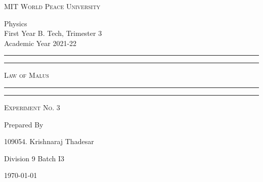 \documentclass[11pt]{article}
\begin{document}
	
	\begin{titlepage} 
		\centering 
		
		
		\huge\textsc{
			MIT World Peace University
		}\\
	
		\vspace{0.75\baselineskip} %
		
		\LARGE{
			Physics\\
			First Year B. Tech, Trimester 3\\
			Academic Year 2021-22
		}
		
		\vfill %
		
		
		\rule{\textwidth}{1.6pt}\vspace*{-\baselineskip}\vspace*{2pt}
		\rule{\textwidth}{0.6pt}
		\vspace{0.75\baselineskip} %
		
		
		
		\huge{\textsc{
				Law of Malus
			}} \\
		
		
		
		\vspace{0.5\baselineskip} %
		\rule{\textwidth}{0.6pt}\vspace*{-\baselineskip}\vspace*{2.8pt}
		\rule{\textwidth}{1.6pt}
		
		\vspace{1\baselineskip} %

			
		\LARGE\textsc{
			Experiment No. 3
		} %
		\vfill
		
		
		Prepared By
		\vspace{0.5\baselineskip} %
		
		\Large{
			109054. Krishnaraj Thadesar
			
			Division 9 Batch I3
		}
		
		
		\vspace{0.5\baselineskip} %
		\today

	\end{titlepage}
\end{document}
